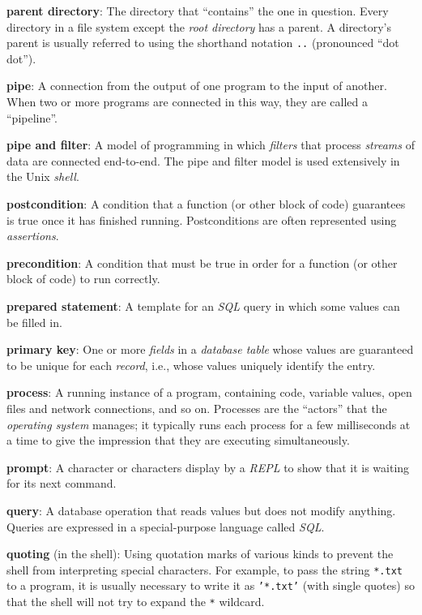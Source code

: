 \documentclass[]{book}
\newcommand{\gdef}[2]{\emph{#2}}
\begin{document}
\textbf{parent directory}: The directory that ``contains'' the one in
question. Every directory in a file system except the
\gdef{g:root-directory}{root directory} has a parent. A directory's
parent is usually referred to using the shorthand notation \texttt{..}
(pronounced ``dot dot'').

\textbf{pipe}: A connection from the output of one program to the input
of another. When two or more programs are connected in this way, they
are called a ``pipeline''.

\textbf{pipe and filter}: A model of programming in which
\gdef{g:filter}{filters} that process \gdef{g:stream}{streams}
of data are connected end-to-end. The pipe and filter model is used
extensively in the Unix \gdef{g:shell}{shell}.

\textbf{postcondition}: A condition that a function (or other block of
code) guarantees is true once it has finished running. Postconditions
are often represented using \gdef{g:assertion}{assertions}.

\textbf{precondition}: A condition that must be true in order for a
function (or other block of code) to run correctly.

\textbf{prepared statement}: A template for an \gdef{g:sql}{SQL}
query in which some values can be filled in.

\textbf{primary key}: One or more \gdef{g:field-database}{fields} in
a \gdef{g:table-database}{database table} whose values are
guaranteed to be unique for each \gdef{g:record-database}{record},
i.e., whose values uniquely identify the entry.

\textbf{process}: A running instance of a program, containing code,
variable values, open files and network connections, and so on.
Processes are the ``actors'' that the
\gdef{g:operating-system}{operating system} manages; it typically
runs each process for a few milliseconds at a time to give the
impression that they are executing simultaneously.

\textbf{prompt}: A character or characters display by a
\gdef{g:repl}{REPL} to show that it is waiting for its next command.

\textbf{query}: A database operation that reads values but does not
modify anything. Queries are expressed in a special-purpose language
called \gdef{g:sql}{SQL}.

\textbf{quoting} (in the shell): Using quotation marks of various kinds
to prevent the shell from interpreting special characters. For example,
to pass the string \texttt{*.txt} to a program, it is usually necessary
to write it as \texttt{'*.txt'} (with single quotes) so that the shell
will not try to expand the \texttt{*} wildcard.
\end{document}
